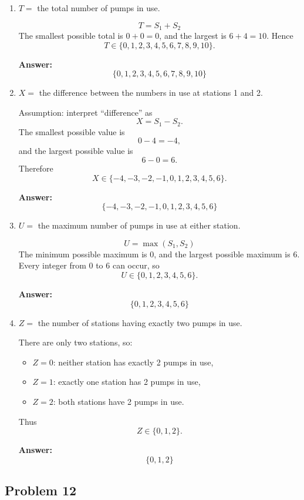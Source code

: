 \documentclass[11pt]{article}
\begin{document}
\begin{enumerate}
    \item[(a)] \(T=\) the total number of pumps in use.

    \[
    T=S_1+S_2
    \]
    The smallest possible total is \(0+0=0\), and the largest is \(6+4=10\). Hence
    \[
    T \in \{0,1,2,3,4,5,6,7,8,9,10\}.
    \]

    \textbf{Answer:}
    \[
    \boxed{\{0,1,2,3,4,5,6,7,8,9,10\}}
    \]

    \item[(b)] \(X=\) the difference between the numbers in use at stations 1 and 2.

    Assumption: interpret “difference” as
    \[
    X=S_1-S_2.
    \]
    The smallest possible value is
    \[
    0-4=-4,
    \]
    and the largest possible value is
    \[
    6-0=6.
    \]
    Therefore
    \[
    X \in \{-4,-3,-2,-1,0,1,2,3,4,5,6\}.
    \]

    \textbf{Answer:}
    \[
    \boxed{\{-4,-3,-2,-1,0,1,2,3,4,5,6\}}
    \]

    \item[(c)] \(U=\) the maximum number of pumps in use at either station.

    \[
    U=\max(S_1,S_2)
    \]
    The minimum possible maximum is \(0\), and the largest possible maximum is \(6\). Every integer from \(0\) to \(6\) can occur, so
    \[
    U \in \{0,1,2,3,4,5,6\}.
    \]

    \textbf{Answer:}
    \[
    \boxed{\{0,1,2,3,4,5,6\}}
    \]

    \item[(d)] \(Z=\) the number of stations having exactly two pumps in use.

    There are only two stations, so:
    \begin{itemize}
        \item \(Z=0\): neither station has exactly 2 pumps in use,
        \item \(Z=1\): exactly one station has 2 pumps in use,
        \item \(Z=2\): both stations have 2 pumps in use.
    \end{itemize}
    Thus
    \[
    Z \in \{0,1,2\}.
    \]

    \textbf{Answer:}
    \[
    \boxed{\{0,1,2\}}
    \]
\end{enumerate}

\subsection*{Problem 12}
\end{document}
